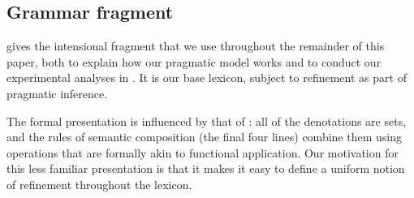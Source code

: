 \documentclass[leqno,12pt]{article}
\begin{document}


\subsection{Grammar fragment}\label{sec:grammar}

 gives the intensional fragment that we use
throughout the remainder of this paper, both to explain how our
pragmatic model works and to conduct our experimental analyses in
. It is our base lexicon, subject to refinement as
part of pragmatic inference.

The formal presentation is influenced by that of \citet{Muskens95}:
all of the denotations are sets, and the rules of semantic composition
(the final four lines) combine them using operations that are formally
akin to functional application. Our motivation for this less familiar
presentation is that it makes it easy to define a uniform notion of
refinement throughout the lexicon.
\end{document}
